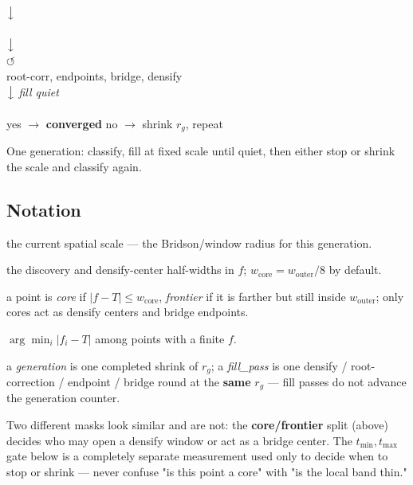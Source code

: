 \begin{marginfigure}
\centering
{}\\[2pt]
$\big\downarrow$\\[2pt]
\\[2pt]
$\big\downarrow$\\[2pt]
 $\circlearrowleft$\\
{\footnotesize root-corr, endpoints, bridge, densify}\\[2pt]
$\big\downarrow$ \emph{fill quiet}\\[2pt]
\\[2pt]
yes $\to$ \textbf{converged} \quad no $\to$ shrink $r_g$, repeat
\caption[The generation loop.]{One generation: classify, fill at fixed scale until
quiet, then either stop or shrink the scale and classify again.}
\end{marginfigure}

\subsection{Notation}

\begin{description}[style=nextline, leftmargin=1.2em]
  \item[$r_g$] the current spatial scale --- the Bridson/window radius for this
        generation.
  \item[$w_{\mathrm{outer}}, w_{\mathrm{core}}$] the discovery and densify-center
        half-widths in $f$; $w_{\mathrm{core}} = w_{\mathrm{outer}}/8$ by default.
  \item[core / frontier] a point is \emph{core} if $\lvert f-T\rvert \le w_{\mathrm{core}}$,
        \emph{frontier} if it is farther but still inside $w_{\mathrm{outer}}$; only
        cores act as densify centers and bridge endpoints.
  \item[best] $\arg\min_i \lvert f_i - T\rvert$ among points with a finite $f$.
  \item[generation / fill\_pass] a \emph{generation} is one completed shrink of $r_g$;
        a \emph{fill\_pass} is one densify / root-correction / endpoint / bridge round
        at the \textbf{same} $r_g$ --- fill passes do not advance the generation
        counter.
\end{description}

\begin{jwarn}
Two different masks look similar and are not: the \textbf{core/frontier} split
(above) decides who may open a densify window or act as a bridge center. The
\textbf{$t_{\min}, t_{\max}$} gate below is a completely separate measurement used only
to decide when to stop or shrink --- never confuse "is this point a core" with "is the
local band thin."
\end{jwarn}

